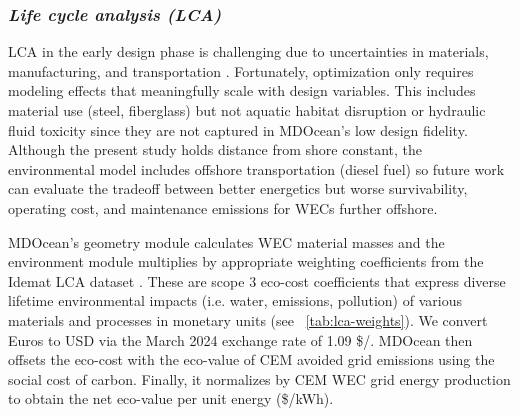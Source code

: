 \documentclass[10pt,twoside]{article}
\begin{document}
\subsubsection{\textit{Life cycle analysis (LCA)}}
LCA in the early design phase is challenging due to uncertainties in materials, manufacturing, and transportation \cite{moni_life_2020}.
Fortunately, optimization only requires modeling effects that meaningfully scale with design variables.
This includes material use (steel, fiberglass) but not aquatic habitat disruption or hydraulic fluid toxicity since they are not captured in MDOcean's low design fidelity.
Although the present study holds distance from shore constant, the environmental model includes offshore transportation (diesel fuel) so future work can evaluate the tradeoff between better energetics but worse survivability, operating cost, and maintenance emissions for WECs further offshore.

MDOcean's geometry module calculates WEC material masses and the environment module multiplies by appropriate weighting coefficients from the Idemat LCA dataset \cite{van_den_herik_idemat_2024}. These are scope 3 eco-cost coefficients \cite{vogtlander_lca-based_2010} that express diverse lifetime environmental impacts (i.e. water, emissions, pollution) of various materials and processes in monetary units (see \tableautorefname~\ref{tab:lca-weights}).
We convert Euros to USD via the March 2024 exchange rate of 1.09 \$/\texteuro.
MDOcean then offsets the eco-cost with the eco-value of CEM avoided grid emissions using the social cost of carbon. Finally, it normalizes by CEM WEC grid energy production to obtain the net eco-value per unit energy (\$/kWh).
\end{document}
